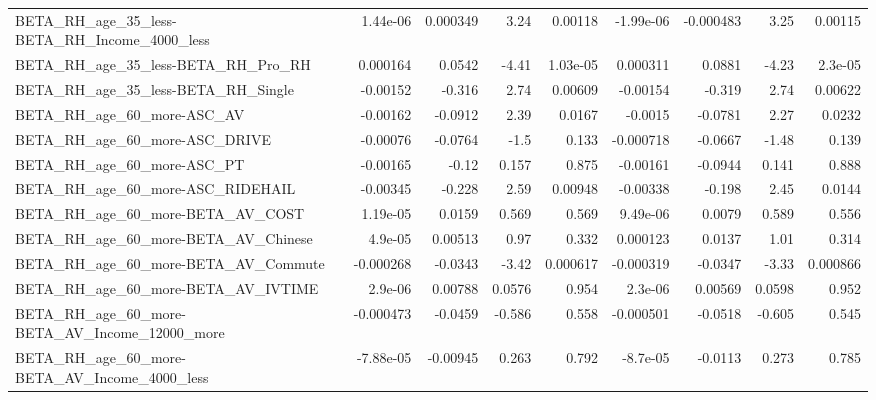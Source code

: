 \begin{tabular}{lrrrrrrrr}
BETA\_RH\_age\_35\_less-BETA\_RH\_Income\_4000\_less       &    1.44e-06 &     0.000349 &      3.24 &  0.00118 &  -1.99e-06 &   -0.000483 &         3.25 &       0.00115 \\
BETA\_RH\_age\_35\_less-BETA\_RH\_Pro\_RH                 &    0.000164 &       0.0542 &     -4.41 & 1.03e-05 &   0.000311 &      0.0881 &        -4.23 &       2.3e-05 \\
BETA\_RH\_age\_35\_less-BETA\_RH\_Single                 &    -0.00152 &       -0.316 &      2.74 &  0.00609 &   -0.00154 &      -0.319 &         2.74 &       0.00622 \\
BETA\_RH\_age\_60\_more-ASC\_AV                         &    -0.00162 &      -0.0912 &      2.39 &   0.0167 &    -0.0015 &     -0.0781 &         2.27 &        0.0232 \\
BETA\_RH\_age\_60\_more-ASC\_DRIVE                      &    -0.00076 &      -0.0764 &      -1.5 &    0.133 &  -0.000718 &     -0.0667 &        -1.48 &         0.139 \\
BETA\_RH\_age\_60\_more-ASC\_PT                         &    -0.00165 &        -0.12 &     0.157 &    0.875 &   -0.00161 &     -0.0944 &        0.141 &         0.888 \\
BETA\_RH\_age\_60\_more-ASC\_RIDEHAIL                   &    -0.00345 &       -0.228 &      2.59 &  0.00948 &   -0.00338 &      -0.198 &         2.45 &        0.0144 \\
BETA\_RH\_age\_60\_more-BETA\_AV\_COST                   &    1.19e-05 &       0.0159 &     0.569 &    0.569 &   9.49e-06 &      0.0079 &        0.589 &         0.556 \\
BETA\_RH\_age\_60\_more-BETA\_AV\_Chinese                &     4.9e-05 &      0.00513 &      0.97 &    0.332 &   0.000123 &      0.0137 &         1.01 &         0.314 \\
BETA\_RH\_age\_60\_more-BETA\_AV\_Commute                &   -0.000268 &      -0.0343 &     -3.42 & 0.000617 &  -0.000319 &     -0.0347 &        -3.33 &      0.000866 \\
BETA\_RH\_age\_60\_more-BETA\_AV\_IVTIME                 &     2.9e-06 &      0.00788 &    0.0576 &    0.954 &    2.3e-06 &     0.00569 &       0.0598 &         0.952 \\
BETA\_RH\_age\_60\_more-BETA\_AV\_Income\_12000\_more      &   -0.000473 &      -0.0459 &    -0.586 &    0.558 &  -0.000501 &     -0.0518 &       -0.605 &         0.545 \\
BETA\_RH\_age\_60\_more-BETA\_AV\_Income\_4000\_less       &   -7.88e-05 &     -0.00945 &     0.263 &    0.792 &   -8.7e-05 &     -0.0113 &        0.273 &         0.785 \\

\end{tabular}
